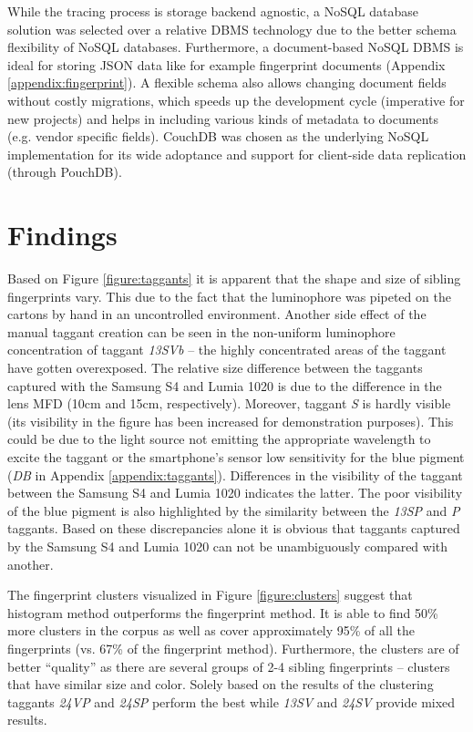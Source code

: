 \documentclass[thesis.tex]{subfiles}
\begin{document}
While the tracing process is storage backend agnostic, a NoSQL database solution was selected over a relative DBMS technology due to the better schema flexibility of NoSQL databases. Furthermore, a document-based NoSQL DBMS is ideal for storing JSON data like for example fingerprint documents (Appendix \ref{appendix:fingerprint}). A flexible schema also allows changing document fields without costly migrations, which speeds up the development cycle (imperative for new projects) and helps in including various kinds of metadata to documents (e.g. vendor specific fields). CouchDB was chosen as the underlying NoSQL implementation for its wide adoptance and support for client-side data replication (through PouchDB).

\section{Findings}
\label{chapter:findings}

Based on Figure \ref{figure:taggants} it is apparent that the shape and size of sibling fingerprints vary. This due to the fact that the luminophore was pipeted on the cartons by hand in an uncontrolled environment. Another side effect of the manual taggant creation can be seen in the non-uniform luminophore concentration of taggant \emph{13SVb} -- the highly concentrated areas of the taggant have gotten overexposed. The relative size difference between the taggants captured with the Samsung S4 and Lumia 1020 is due to the difference in the lens MFD (10cm and 15cm, respectively). Moreover, taggant \emph{S} is hardly visible (its visibility in the figure has been increased for demonstration purposes). This could be due to the light source not emitting the appropriate wavelength to excite the taggant or the smartphone's sensor low sensitivity for the blue pigment (\emph{DB} in Appendix \ref{appendix:taggants}). Differences in the visibility of the taggant between the Samsung S4 and Lumia 1020 indicates the latter. The poor visibility of the blue pigment is also highlighted by the similarity between the \emph{13SP} and \emph{P} taggants. Based on these discrepancies alone it is obvious that taggants captured by the Samsung S4 and Lumia 1020 can not be unambiguously compared with another.

The fingerprint clusters visualized in Figure \ref{figure:clusters} suggest that histogram method outperforms the fingerprint method. It is able to find 50\% more clusters in the corpus as well as cover approximately 95\% of all the fingerprints (vs. 67\% of the fingerprint method). Furthermore, the clusters are of better ``quality'' as there are several groups of 2-4 sibling fingerprints -- clusters that have similar size and color. Solely based on the results of  the clustering taggants \emph{24VP} and \emph{24SP} perform the best while \emph{13SV} and \emph{24SV} provide mixed results.
\end{document}
